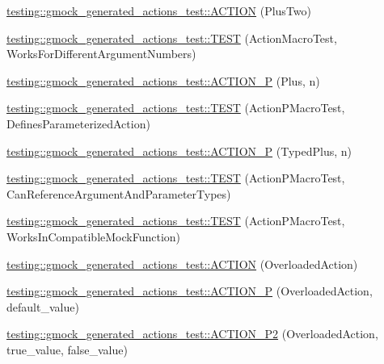\begin{DoxyCompactItemize}
\item 
\hyperlink{namespacetesting_1_1gmock__generated__actions__test_a0eef2f885ccb1e4fac88a910f0fc5c2e}{testing\+::gmock\+\_\+generated\+\_\+actions\+\_\+test\+::\+A\+C\+T\+I\+ON} (Plus\+Two)
\item 
\hyperlink{namespacetesting_1_1gmock__generated__actions__test_acb98f6208678d9f5500a0c2c095b8cd0}{testing\+::gmock\+\_\+generated\+\_\+actions\+\_\+test\+::\+T\+E\+ST} (Action\+Macro\+Test, Works\+For\+Different\+Argument\+Numbers)
\item 
\hyperlink{namespacetesting_1_1gmock__generated__actions__test_ac081154b3ae2f099bd5be853cacfdaa4}{testing\+::gmock\+\_\+generated\+\_\+actions\+\_\+test\+::\+A\+C\+T\+I\+O\+N\+\_\+P} (Plus, n)
\item 
\hyperlink{namespacetesting_1_1gmock__generated__actions__test_a42a5fe606ca18b2eb1e5d7884045118f}{testing\+::gmock\+\_\+generated\+\_\+actions\+\_\+test\+::\+T\+E\+ST} (Action\+P\+Macro\+Test, Defines\+Parameterized\+Action)
\item 
\hyperlink{namespacetesting_1_1gmock__generated__actions__test_a3bcd440e11ab64ad5eb007efce33cf7d}{testing\+::gmock\+\_\+generated\+\_\+actions\+\_\+test\+::\+A\+C\+T\+I\+O\+N\+\_\+P} (Typed\+Plus, n)
\item 
\hyperlink{namespacetesting_1_1gmock__generated__actions__test_a4262c10efb367abf9771b3060c57d190}{testing\+::gmock\+\_\+generated\+\_\+actions\+\_\+test\+::\+T\+E\+ST} (Action\+P\+Macro\+Test, Can\+Reference\+Argument\+And\+Parameter\+Types)
\item 
\hyperlink{namespacetesting_1_1gmock__generated__actions__test_ab545244777c7559d1b0c2c63ee2be134}{testing\+::gmock\+\_\+generated\+\_\+actions\+\_\+test\+::\+T\+E\+ST} (Action\+P\+Macro\+Test, Works\+In\+Compatible\+Mock\+Function)
\item 
\hyperlink{namespacetesting_1_1gmock__generated__actions__test_a24927d97882dc1d52e203720df804188}{testing\+::gmock\+\_\+generated\+\_\+actions\+\_\+test\+::\+A\+C\+T\+I\+ON} (Overloaded\+Action)
\item 
\hyperlink{namespacetesting_1_1gmock__generated__actions__test_a1ee92e8b8bd6a5a54f5d2fcdb9f122b8}{testing\+::gmock\+\_\+generated\+\_\+actions\+\_\+test\+::\+A\+C\+T\+I\+O\+N\+\_\+P} (Overloaded\+Action, default\+\_\+value)
\item 
\hyperlink{namespacetesting_1_1gmock__generated__actions__test_a233ee874462c7956e154945975da1127}{testing\+::gmock\+\_\+generated\+\_\+actions\+\_\+test\+::\+A\+C\+T\+I\+O\+N\+\_\+\+P2} (Overloaded\+Action, true\+\_\+value, false\+\_\+value)

\end{DoxyCompactItemize}
